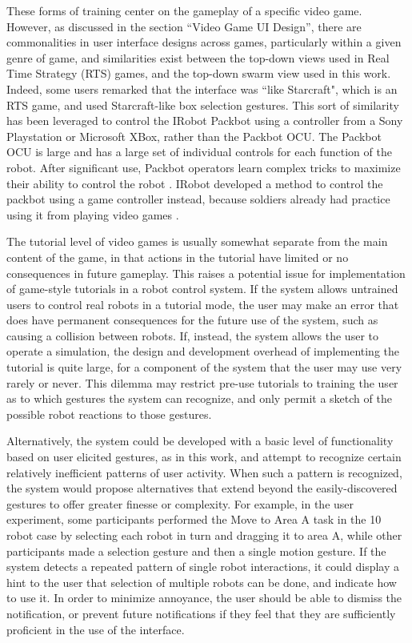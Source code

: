 These forms of training center on the gameplay of a specific video game. 
However, as discussed in the section ``Video Game UI Design'', there are commonalities in user interface designs across games, particularly within a given genre of game, and similarities exist between the top-down views used in Real Time Strategy (RTS) games, and the top-down swarm view used in this work. 
Indeed, some users remarked that the interface was ``like Starcraft", which is an RTS game, and used Starcraft-like box selection gestures. 
This sort of similarity has been leveraged to control the IRobot Packbot using a controller from a Sony Playstation or Microsoft XBox, rather than the Packbot OCU. 
The Packbot OCU is large and has a large set of individual controls for each function of the robot. 
After significant use, Packbot operators learn complex tricks to maximize their ability to control the robot \citep{micire2011design}.
IRobot developed a method to control the packbot using a game controller instead, because soldiers already had practice using it from playing video games \citep{glaser2010impact}. 

The tutorial level of video games is usually somewhat separate from the main content of the game, in that actions in the tutorial have limited or no consequences in future gameplay. 
This raises a potential issue for implementation of game-style tutorials in a robot control system. 
If the system allows untrained users to control real robots in a tutorial mode, the user may make an error that does have permanent consequences for the future use of the system, such as causing a collision between robots. 
If, instead, the system allows the user to operate a simulation, the design and development overhead of implementing the tutorial is quite large, for a component of the system that the user may use very rarely or never. 
This dilemma may restrict pre-use tutorials to training the user as to which gestures the system can recognize, and only permit a sketch of the possible robot reactions to those gestures. 

Alternatively, the system could be developed with a basic level of functionality based on user elicited gestures, as in this work, and attempt to recognize certain relatively inefficient patterns of user activity. 
When such a pattern is recognized, the system would propose alternatives that extend beyond the easily-discovered gestures to offer greater finesse or complexity. 
For example, in the user experiment, some participants performed the Move to Area A task in the 10 robot case by selecting each robot in turn and dragging it to area A, while other participants made a selection gesture and then a single motion gesture. 
If the system detects a repeated pattern of single robot interactions, it could display a hint to the user that selection of multiple robots can be done, and indicate how to use it. 
In order to minimize annoyance, the user should be able to dismiss the notification, or prevent future notifications if they feel that they are sufficiently proficient in the use of the interface. 

